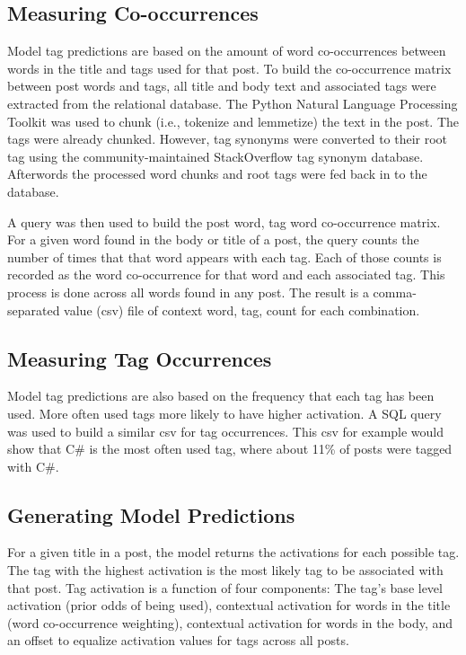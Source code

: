 \documentclass[10pt,letterpaper]{article}
\begin{document}
\subsection{Measuring Co-occurrences}

Model tag predictions are based on the amount of word co-occurrences between words in the title and tags used for that post.
To build the co-occurrence matrix between post words and tags, all title and body text and associated tags were extracted from the relational database.
The Python Natural Language Processing Toolkit \cite{Bird2009} was used to chunk (i.e., tokenize and lemmetize) the text in the post.
The tags were already chunked.
However, tag synonyms were converted to their root tag using the community-maintained StackOverflow tag synonym database.
Afterwords the processed word chunks and root tags were fed back in to the database.

A query was then used to build the post word, tag word co-occurrence matrix.
For a given word found in the body or title of a post, the query counts the number of times that that word appears with each tag.
Each of those counts is recorded as the word co-occurrence for that word and each associated tag.
This process is done across all words found in any post.
The result is a comma-separated value (csv) file of context word, tag, count for each combination.

\subsection{Measuring Tag Occurrences}

Model tag predictions are also based on the frequency that each tag has been used.
More often used tags more likely to have higher activation.
A SQL query was used to build a similar csv for tag occurrences.
This csv for example would show that C\# is the most often used tag, where about 11\% of posts were tagged with C\#.

\subsection{Generating Model Predictions}

For a given title in a post, the model returns the activations for each possible tag.
The tag with the highest activation is the most likely tag to be associated with that post.
Tag activation is a function of four components:
The tag's base level activation (prior odds of being used),
contextual activation for words in the title (word co-occurrence weighting),
contextual activation for words in the body,
and an offset to equalize activation values for tags across all posts.
\end{document}
